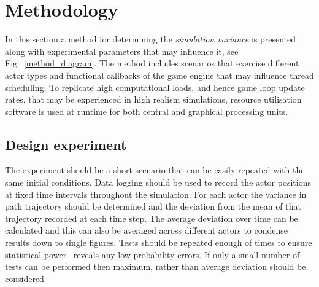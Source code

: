 \section{Methodology} \label{s:methodology}

In this section a method for determining the \textit{simulation variance} is presented along with experimental parameters that may influence it, see Fig.~\ref{method_diagram}. The method includes scenarios that exercise different actor types and functional callbacks of the game engine that may influence thread scheduling. To replicate high computational loads, and hence game loop update rates, that may be experienced in high realism simulations, resource utilisation software is used at runtime for both central and graphical processing units.

%

\subsection{Design experiment}
The experiment should be a short scenario that can be easily repeated with the same initial conditions. Data logging should be used to record the actor positions at fixed time intervals throughout the simulation. For each actor the variance in path trajectory should be determined and the deviation from the mean of that trajectory recorded at each time step. The average deviation over time can be calculated and this can also be averaged across different actors to condense results down to single figures. Tests should be repeated enough of times to ensure statistical power~\cite{cohen2013statistical} reveals any low probability errors. If only a small number of tests can be performed  then maximum, rather than average deviation should be considered 


